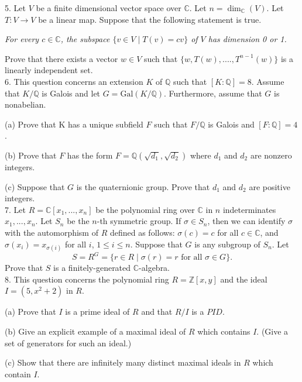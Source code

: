 \documentclass[11pt]{article}
\newcommand{\Z}{\mathbb{Z}}
\newcommand{\Q}{\mathbb{Q}}
\newcommand{\C}{\mathbb{C}}
\begin{document}
5. Let $V$ be a finite dimensional vector space over $\C$. Let $n = \dim_\C(V )$. Let
$T : V \to V$ be a linear map. Suppose that the following statement is true.

\emph{For every $c \in\C$, the subspace $\{v\in V\mid T(v) = cv\}$ of $V$ has dimension 0 or 1.}

Prove that there exists a vector $w \in V$ such that $\{w, T(w), ...., T^{n−1}
(w)\}$ is a linearly
independent set.\\


6. This question concerns an extension $K$ of $\Q$ such that $[K :\Q] = 8$. Assume
that $K/\Q$ is Galois and let $G = \mbox{Gal}(K/\Q)$. Furthermore, assume that $G$ is nonabelian.

(a) Prove that K has a unique subfield $F$ such that $F/\Q$ is Galois and $[F : \Q] = 4$.

(b) Prove that $F$ has the form $F =\Q(\sqrt{d_1},\sqrt{d_2})$ where $d_1$ and $d_2$ are nonzero integers.

(c) Suppose that $G$ is the quaternionic group. Prove that $d_1$ and $d_2$ are positive integers.\\


7. Let $R = \C[x_1, ..., x_n]$ be the polynomial ring over $\C$ in $n$ indeterminates
$x_1, ..., x_n$. Let $S_n$ be the $n$-th symmetric group. If $\sigma \in S_n$, then we can identify $\sigma $ with the
automorphism of $R$ defined as follows: $\sigma (c) = c$ for all $c \in\C$, and $\sigma (x_i) = x_{\sigma(i)}$
for all $i$,
$1 \le i \le n$. Suppose that $G$ is any subgroup of $S_n$. Let
 \[S = R^G = \{r\in R\mid \sigma(r) = r \text{ for all } \sigma\in G\}.
\]
Prove that $S$ is a finitely-generated $\C$-algebra.\\


8. This question concerns the polynomial ring $R = \Z[x, y]$ and the ideal
$I = (5, x^2 + 2)$ in $R$.

(a) Prove that $I$ is a prime ideal of $R$ and that $R/I$ is a $PID$.

(b) Give an explicit example of a maximal ideal of $R$ which contains $I$.
(Give a set of generators for such an ideal.)

(c) Show that there are infinitely many distinct maximal ideals in $R$ which contain $I$.
\end{document}
